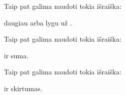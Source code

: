 \documentclass[letterpaper,10pt,lithuanian]{sphinxmanual}
\begin{document}

\begin{fulllineitems}
\label{\detokenize{formules:func.ge}}
\pysigstartsignatures
{}
\pysigstopsignatures
\sphinxAtStartPar
Taip pat galima naudoti tokia išraiška:

\begin{sphinxVerbatim}[commandchars=\\\{\}]
  
\end{sphinxVerbatim}

\sphinxAtStartPar
{} daugiau arba lygu už .

\end{fulllineitems}


\begin{fulllineitems}
\label{\detokenize{formules:func.add}}
\pysigstartsignatures
{}
\pysigstopsignatures
\sphinxAtStartPar
Taip pat galima naudoti tokia išraiška:

\begin{sphinxVerbatim}[commandchars=\\\{\}]
  
\end{sphinxVerbatim}

\sphinxAtStartPar
{} ir  suma.

\end{fulllineitems}


\begin{fulllineitems}
\label{\detokenize{formules:func.sub}}
\pysigstartsignatures
{}
\pysigstopsignatures
\sphinxAtStartPar
Taip pat galima naudoti tokia išraiška:

\begin{sphinxVerbatim}[commandchars=\\\{\}]
  
\end{sphinxVerbatim}

\sphinxAtStartPar
{} ir  skirtumas.

\end{fulllineitems}
\end{document}
